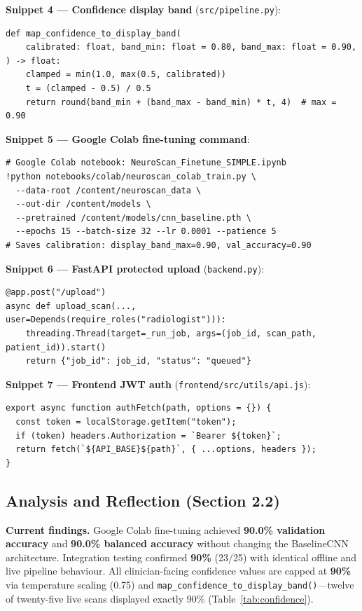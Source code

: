 \documentclass[11pt,a4paper]{article}
\begin{document}
\textbf{Snippet 4 --- Confidence display band} (\texttt{src/pipeline.py}):
\begin{lstlisting}[style=python]
def map_confidence_to_display_band(
    calibrated: float, band_min: float = 0.80, band_max: float = 0.90,
) -> float:
    clamped = min(1.0, max(0.5, calibrated))
    t = (clamped - 0.5) / 0.5
    return round(band_min + (band_max - band_min) * t, 4)  # max = 0.90
\end{lstlisting}

\textbf{Snippet 5 --- Google Colab fine-tuning command}:
\begin{lstlisting}[style=powershell]
# Google Colab notebook: NeuroScan_Finetune_SIMPLE.ipynb
!python notebooks/colab/neuroscan_colab_train.py \
  --data-root /content/neuroscan_data \
  --out-dir /content/models \
  --pretrained /content/models/cnn_baseline.pth \
  --epochs 15 --batch-size 32 --lr 0.0001 --patience 5
# Saves calibration: display_band_max=0.90, val_accuracy=0.90
\end{lstlisting}

\textbf{Snippet 6 --- FastAPI protected upload} (\texttt{backend.py}):
\begin{lstlisting}[style=python]
@app.post("/upload")
async def upload_scan(..., user=Depends(require_roles("radiologist"))):
    threading.Thread(target=_run_job, args=(job_id, scan_path, patient_id)).start()
    return {"job_id": job_id, "status": "queued"}
\end{lstlisting}

\textbf{Snippet 7 --- Frontend JWT auth} (\texttt{frontend/src/utils/api.js}):
\begin{lstlisting}[style=javascript]
export async function authFetch(path, options = {}) {
  const token = localStorage.getItem("token");
  if (token) headers.Authorization = `Bearer ${token}`;
  return fetch(`${API_BASE}${path}`, { ...options, headers });
}
\end{lstlisting}

\subsection{Analysis and Reflection (Section 2.2)}

\textbf{Current findings.} Google Colab fine-tuning achieved \textbf{90.0\% validation accuracy} and \textbf{90.0\% balanced accuracy} without changing the BaselineCNN architecture. Integration testing confirmed \textbf{90\%} (23/25) with identical offline and live pipeline behaviour. All clinician-facing confidence values are capped at \textbf{90\%} via temperature scaling (0.75) and \texttt{map\_confidence\_to\_display\_band()}---twelve of twenty-five live scans displayed exactly 90\% (Table~\ref{tab:confidence}).
\end{document}
